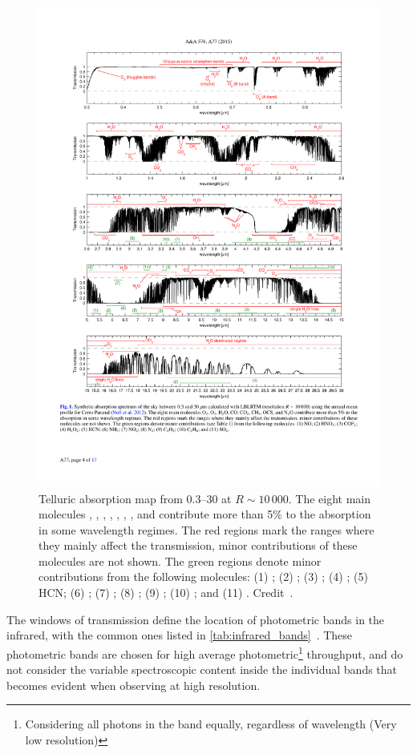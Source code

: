 \begin{figure}
    \centering
    \includegraphics[width=0.9\linewidth]{figures/atmos_and_models/cropped_molecfit_absorption}
    \caption[Telluric absorption map from 0.3--30\um{} at $R\sim10\,000$.]{Telluric absorption map from 0.3--30\um{} at $R\sim10\,000$.
        The eight main molecules , , , , , , , and  contribute more than 5\% to the absorption in some wavelength regimes.
        The red regions mark the ranges where they mainly affect the transmission, minor contributions of these molecules are not shown.
        The green regions denote minor contributions from the following molecules: (1) ; (2) ; (3) ; (4) ; (5) {HCN}; (6) ; (7) ; (8) ; (9) ; (10) ; and (11) .
        Credit~\citet[][Figure~1]{smette_molecfit_2015}.}
    \label{fig:croppedmolecfitabsorbtion}
\end{figure}

The windows of transmission define the location of photometric bands in the infrared, with the common ones listed in \cref{tab:infrared_bands}~\citep[see e.g.][]{sterken_astronomical_1992, binney_galactic_1998}.
These photometric bands are chosen for high average photometric\footnote{Considering all photons in the band equally, regardless of wavelength (Very low resolution)} throughput, and do not consider the variable spectroscopic content inside the individual bands that becomes evident when observing at high resolution.

